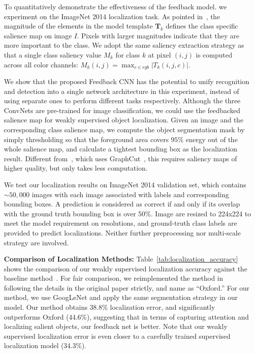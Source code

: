 To quantitatively demonstrate the effectiveness of the feedback model. we experiment on the ImageNet 2014 localization task. As pointed in~\cite{simonyan2013deep}, the magnitude of the elements in the model template $\mathbf{T}_k$ defines the class specific salience map on image $I$. Pixels with larger magnitudes indicate that they are more important to the class. We adopt the same saliency extraction strategy as~\cite{simonyan2013deep} that a single class saliency value $M_k$ for class $k$ at pixel $(i,j)$ is computed across all color channels: $M_k(i,j) = \max_{c \in rgb} | T_k(i,j,c) |$.

We show that the proposed Feedback CNN has the potential to unify recognition and detection into a single network architecture in this experiment, instead of using separate ones to perform different tasks respectively. Although the three ConvNets are pre-trained for image classification, we could use the feedbacked salience map for weakly supervised object localization. Given an image and the corresponding class salience map, we compute the object segmentation mask by simply thresholding so that the foreground area covers $95\%$ energy out of the whole salience map, and calculate a tightest bounding box as the localization result. Different from~\cite{simonyan2013deep}, which uses GraphCut~\cite{yuri2001interactive}, this requires saliency maps of higher quality, but only takes less computation.

We test our localization results on ImageNet 2014 validation set, which contains $\sim50,000$ images with each image associated with labels and corresponding bounding boxes. A prediction is considered as correct if and only if its overlap with the ground truth bounding box is over 50\%. Image are resized  to 224x224 to meet the model requirement on resolutions, and ground-truth class labels are provided to predict localizations. Neither further preprocessing nor multi-scale strategy are involved.

\textbf{Comparison of Localization Methods:} Table~\ref{tab:localization_accuracy} shows the comparison of our weakly supervised localization accuracy against the baseline method~\cite{simonyan2013deep}. For fair comparison, we reimplemented the method in~\cite{simonyan2013deep} following the details in the original paper strictly, and name as ``Oxford.'' For our method, we use GoogLeNet and apply the same segmentation strategy in our model. Our method obtains 38.8\% localization error, and significantly outperforms Oxford (44.6\%), suggesting that in terms of capturing attention and localizing salient objects, our feedback net is better. Note that our weakly supervised localization error is even closer to a carefully trained supervised localization model (34.3\%).

